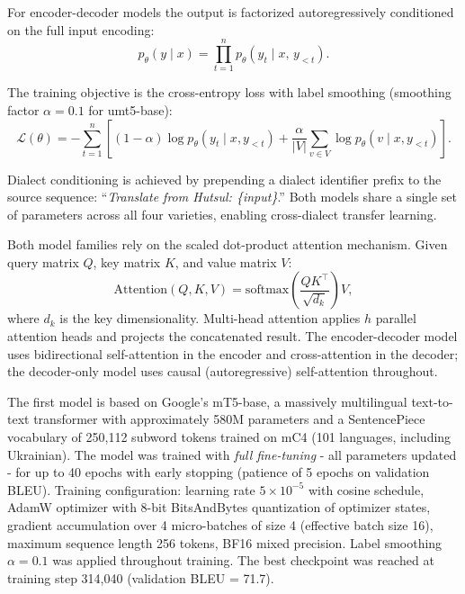 \documentclass[14pt]{extarticle}
\begin{document}
For encoder-decoder models the output is factorized autoregressively conditioned on the full
input encoding:
\begin{equation}
p_{\theta}(y \mid x) = \prod_{t=1}^{n} p_{\theta}(y_t \mid x,\, y_{<t}).
\label{eq:abs_factorize}
\end{equation}

The training objective is the cross-entropy loss with label smoothing (smoothing factor
$\alpha = 0.1$ for umt5-base):
\begin{equation}
\mathcal{L}(\theta) = -\sum_{t=1}^{n}
\left[
  (1 - \alpha)\log p_{\theta}(y_t \mid x, y_{<t})
  + \frac{\alpha}{|V|}\sum_{v \in V}\log p_{\theta}(v \mid x, y_{<t})
\right].
\label{eq:abs_loss}
\end{equation}

Dialect conditioning is achieved by prepending a dialect identifier prefix to the source sequence:
``\textit{Translate from Hutsul: \{input\}}.'' Both models share a single set of parameters
across all four varieties, enabling cross-dialect transfer learning.

Both model families rely on the scaled dot-product attention mechanism. Given query matrix $Q$,
key matrix $K$, and value matrix $V$:
\begin{equation}
\mathrm{Attention}(Q, K, V) = \mathrm{softmax}\!\left(\frac{QK^\top}{\sqrt{d_k}}\right)V,
\label{eq:abs_attn}
\end{equation}
where $d_k$ is the key dimensionality. Multi-head attention applies $h$ parallel attention
heads and projects the concatenated result. The encoder-decoder model uses bidirectional
self-attention in the encoder and cross-attention in the decoder; the decoder-only model uses
causal (autoregressive) self-attention throughout.

The first model is based on Google's mT5-base, a massively multilingual text-to-text transformer
with approximately 580M parameters and a SentencePiece vocabulary of 250,112 subword tokens
trained on mC4 (101 languages, including Ukrainian). The model was trained with \textit{full
fine-tuning} - all parameters updated - for up to 40 epochs with early stopping (patience of 5
epochs on validation BLEU). Training configuration: learning rate $5 \times 10^{-5}$ with cosine
schedule, AdamW optimizer with 8-bit BitsAndBytes quantization of optimizer states, gradient
accumulation over 4 micro-batches of size 4 (effective batch size 16), maximum sequence length
256 tokens, BF16 mixed precision. Label smoothing $\alpha = 0.1$ was applied throughout training.
The best checkpoint was reached at training step 314,040 (validation BLEU = 71.7).
\end{document}
